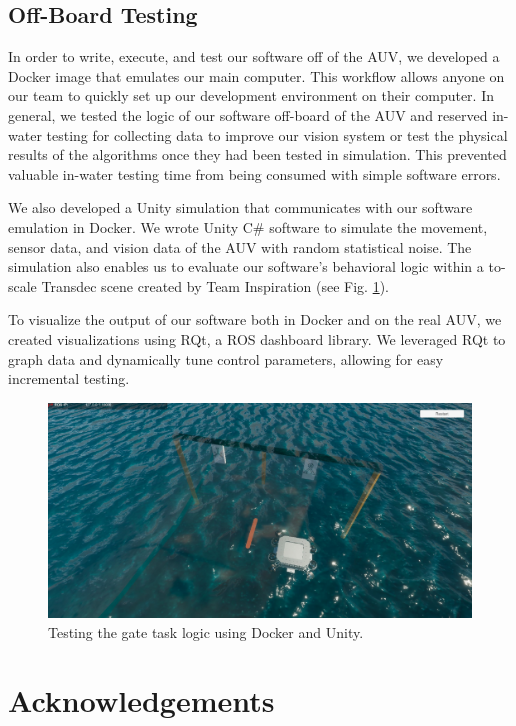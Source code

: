 \documentclass[conference]{IEEEtran}
\begin{document}
\subsection{Off-Board Testing}
\label{ssec:off_board_testing}
In order to write, execute, and test our software off of the AUV, we developed a Docker image that emulates our main computer. This workflow allows anyone on our team to quickly set up our development environment on their computer. In general, we tested the logic of our software off-board of the AUV and reserved in-water testing for collecting data to improve our vision system or test the physical results of the algorithms once they had been tested in simulation. This prevented valuable in-water testing time from being consumed with simple software errors.

We also developed a Unity simulation that communicates with our software emulation in Docker. We wrote Unity C\# software to simulate the movement, sensor data, and vision data of the AUV with random statistical noise. The simulation also enables us to evaluate our software's behavioral logic within a to-scale Transdec scene created by Team Inspiration \cite{b5} (see Fig. \ref{fig:unity}).

To visualize the output of our software both in Docker and on the real AUV, we created visualizations using RQt, a ROS dashboard library. We leveraged RQt to graph data and dynamically tune control parameters, allowing for easy incremental testing.

\begin{figure}[htbp]
    \centerline{\includegraphics[scale=0.16]{images/unity_new.jpg}}
    \caption{Testing the gate task logic using Docker and Unity.}
    \label{fig:unity}
\end{figure}

\section*{Acknowledgements}
\end{document}
